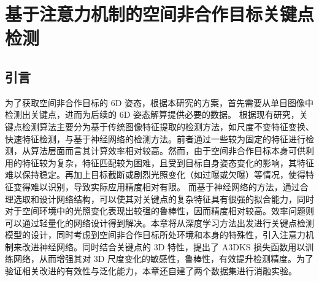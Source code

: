 \chapter{基于注意力机制的空间非合作目标关键点检测}
\label{chap:attention_kpt}
\section{引言}
为了获取空间非合作目标的 6D 姿态，根据本研究的方案，首先需要从单目图像中检测出关键点，进而为后续的 6D 姿态解算提供必要的数据。
根据现有研究，关键点检测算法主要分为基于传统图像特征提取的检测方法，如尺度不变特征变换\citep{sift}、快速特征检测\citep{fast}，与基于神经网络的检测方法。前者通过一些较为固定的特征进行检测，从算法层面而言其计算效率相对较高。然而，由于空间非合作目标本身可供利用的特征较为复杂，特征匹配较为困难，且受到目标自身姿态变化的影响，其特征难以保持稳定。再加上目标截断或剧烈光照变化（如过曝或欠曝）等情况，使得特征变得难以识别，导致实际应用精度相对有限。
而基于神经网络的方法，通过合理选取和设计网络结构，可以使其对关键点的复杂特征具有很强的拟合能力，同时对于空间环境中的光照变化表现出较强的鲁棒性，因而精度相对较高。效率问题则可以通过轻量化的网络设计得到解决。本章将从深度学习方法出发进行关键点检测模型的设计，同时考虑到空间非合作目标所处环境和本身的特殊性，引入注意力机制来改进神经网络。同时结合关键点的 3D 特性，提出了 A3DKS 损失函数用以训练网络，从而增强其对 3D 尺度变化的敏感性，鲁棒性，有效提升检测精度。为了验证相关改进的有效性与泛化能力，本章还自建了两个数据集进行消融实验。
